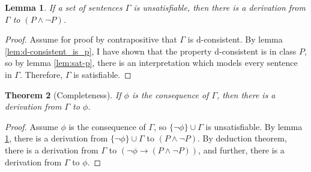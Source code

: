 \documentclass[12pt]{article}
\newtheorem{theorem}{Theorem}[section]
\newtheorem{lemma}[theorem]{Lemma}
\theoremstyle{definition}
\theoremstyle{remark}
\begin{document}
\begin{lemma}
	\label{lem:completeness-principle}
	If a set of sentences $\Gamma$ is unsatisfiable, then there is a derivation from $\Gamma$ to $(P \land \neg P)$. 
\end{lemma}

\begin{proof}
	Assume for proof by contrapositive that $\Gamma$ is d-consistent. By lemma \ref{lem:d-consistent_is_p}, I have shown that the property d-consistent is in class $P$, so by lemma \ref{lem:sat-p}, there is an interpretation which models every sentence in $\Gamma$. Therefore, $\Gamma$ is satisfiable.
\end{proof}

\begin{theorem}[Completeness]
	If $\phi$ is the consequence of $\Gamma$, then there is a derivation from $\Gamma$ to $\phi$.
\end{theorem}

\begin{proof}
	Assume $\phi$ is the consequence of $\Gamma$, so $\{ \neg\phi \} \cup \Gamma$ is unsatisfiable. By lemma \ref{lem:completeness-principle}, there is a derivation from $\{ \neg\phi \} \cup \Gamma$ to $(P \land \neg P)$. By deduction theorem, there is a derivation from $\Gamma$ to $(\neg\phi \rightarrow (P \land \neg P))$, and further, there is a derivation from $\Gamma$ to $\phi$.
\end{proof}
\end{document}
